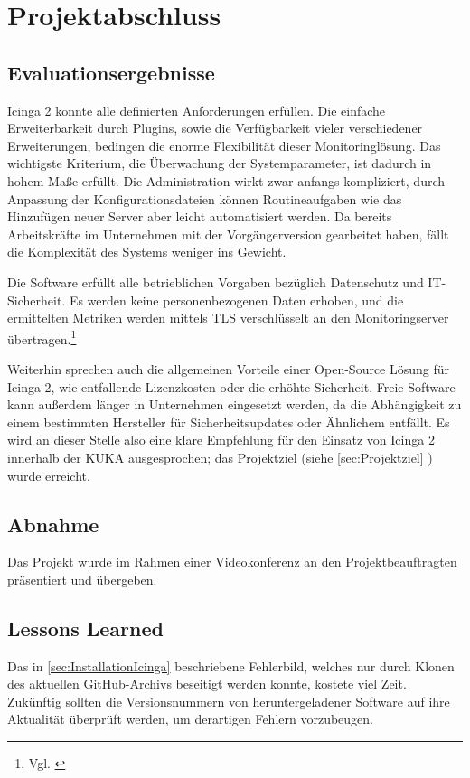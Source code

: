 \section{Projektabschluss} 
\label{sec:projektabschluss}

\subsection{Evaluationsergebnisse}
\label{sec:Evaluationsergebnisse}
\glqq{}Icinga 2\grqq{} konnte alle definierten Anforderungen erfüllen. Die einfache Erweiterbarkeit durch Plugins, sowie die Verfügbarkeit vieler verschiedener Erweiterungen, bedingen die enorme Flexibilität dieser Monitoringlösung. Das wichtigste Kriterium, die Überwachung der Systemparameter, ist dadurch in hohem Maße erfüllt. Die Administration wirkt zwar anfangs kompliziert, durch Anpassung der Konfigurationsdateien können Routineaufgaben wie das Hinzufügen neuer Server aber leicht automatisiert werden. Da bereits Arbeitskräfte im Unternehmen mit der Vorgängerversion gearbeitet haben, fällt die Komplexität des Systems weniger ins Gewicht.

Die Software erfüllt alle betrieblichen Vorgaben bezüglich Datenschutz und IT-Sicherheit. Es werden keine personenbezogenen Daten erhoben, und die ermittelten Metriken werden mittels TLS verschlüsselt an den Monitoringserver übertragen.\footnote{Vgl. \cite{IcingaTLS}}

Weiterhin sprechen auch die allgemeinen Vorteile einer Open-Source Lösung für \glqq{}Icinga 2\grqq{}, wie entfallende Lizenzkosten oder die erhöhte Sicherheit. Freie Software kann außerdem länger in Unternehmen eingesetzt werden, da die Abhängigkeit zu einem bestimmten Hersteller für Sicherheitsupdates oder Ähnlichem entfällt. Es wird an dieser Stelle also eine klare Empfehlung für den Einsatz von \glqq{}Icinga 2\grqq{} innerhalb der KUKA ausgesprochen; das Projektziel (siehe \ref{sec:Projektziel} ) wurde erreicht.

\subsection{Abnahme}
\label{sec:Abnahme}
Das Projekt wurde im Rahmen einer Videokonferenz an den Projektbeauftragten präsentiert und übergeben.

\subsection{Lessons Learned}
\label{sec:LessonsLearned}
Das in \ref{sec:InstallationIcinga}  beschriebene Fehlerbild, welches nur durch Klonen des aktuellen GitHub-Archivs beseitigt werden konnte, kostete viel Zeit. Zukünftig sollten die Versionsnummern von heruntergeladener Software auf ihre Aktualität überprüft werden, um derartigen Fehlern vorzubeugen.


